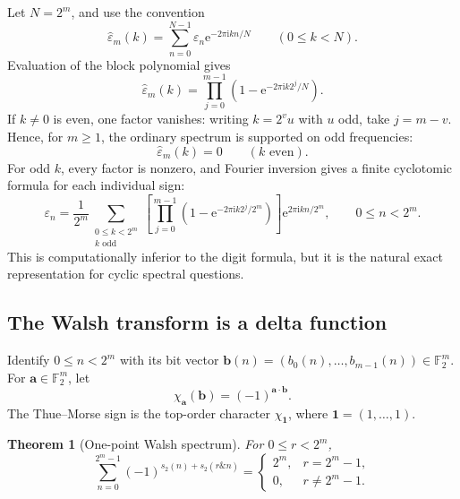 \documentclass[11pt,oneside]{article}
\newtheorem{theorem}{Theorem}[section]
\theoremstyle{definition}
\theoremstyle{remark}
\newcommand{\Ftwo}{\mathbb F_2}
\newcommand{\e}{\mathrm e}
\newcommand{\ii}{\mathrm i}
\newcommand{\wt}{s_2}
\newcommand{\eps}{\varepsilon}
\newcommand{\bitand}{\mathbin{\&}}
\begin{document}
Let \(N=2^m\), and use the convention
\begin{equation}
  \widehat\eps_m(k)=\sum_{n=0}^{N-1}\eps_n\e^{-2\pi\ii kn/N}
  \qquad(0\le k<N).                                        \label{eq:DFT-definition}
\end{equation}
Evaluation of the block polynomial gives
\begin{equation}
  \boxed{
  \widehat\eps_m(k)=
  \prod_{j=0}^{m-1}\left(1-\e^{-2\pi\ii k2^j/N}\right).}  \label{eq:exact-DFT}
\end{equation}
If \(k\ne0\) is even, one factor vanishes: writing \(k=2^vu\) with \(u\) odd, take
\(j=m-v\).  Hence, for \(m\ge1\), the ordinary spectrum is supported on odd frequencies:
\begin{equation}
  \widehat\eps_m(k)=0\qquad(k\text{ even}).                \label{eq:DFT-even-zero}
\end{equation}
For odd \(k\), every factor is nonzero, and Fourier inversion gives a finite cyclotomic
formula for each individual sign:
\begin{equation}
  \boxed{
  \eps_n=\frac1{2^m}\sum_{\substack{0\le k<2^m\\k\text{ odd}}}
  \left[\prod_{j=0}^{m-1}
     \left(1-\e^{-2\pi\ii k2^j/2^m}\right)\right]
  \e^{2\pi\ii kn/2^m},\qquad 0\le n<2^m.}                 \label{eq:DFT-inversion}
\end{equation}
This is computationally inferior to the digit formula, but it is the natural exact
representation for cyclic spectral questions.

\subsection{The Walsh transform is a delta function}

Identify \(0\le n<2^m\) with its bit vector
\(\bm b(n)=(b_0(n),\ldots,b_{m-1}(n))\in\Ftwo^m\).  For
\(\bm a\in\Ftwo^m\), let
\begin{equation}
  \chi_{\bm a}(\bm b)=(-1)^{\bm a\cdot\bm b}.              \label{eq:Walsh-character}
\end{equation}
The Thue--Morse sign is the top-order character
\(\chi_{\bm1}\), where \(\bm1=(1,\ldots,1)\).

\begin{theorem}[One-point Walsh spectrum]
\label{thm:Walsh-delta}
For \(0\le r<2^m\),
\begin{equation}
  \boxed{
  \sum_{n=0}^{2^m-1}(-1)^{\wt(n)+\wt(r\bitand n)}
  =\begin{cases}
     2^m,&r=2^m-1,\\
     0,&r\ne2^m-1.
   \end{cases}}                                            \label{eq:Walsh-delta}
\end{equation}
\end{theorem}
\end{document}
